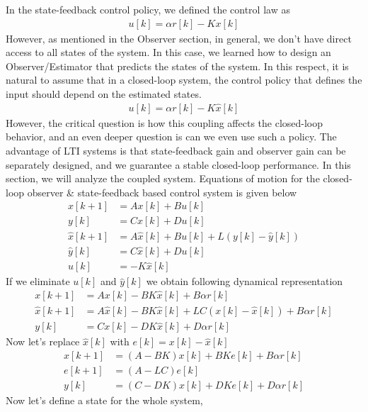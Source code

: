 \documentclass[twoside]{article}
\begin{document}
In the state-feedback control policy, we defined the control
law as
%
\begin{align*}
 u[k] = \alpha r[k] - K x[k]
\end{align*}
%
However, as mentioned in the Observer section, in general, we don't have direct access to all states of the system. In this case, we learned how to design an Observer/Estimator that predicts the states of the system. In this respect, it is natural to assume that in a closed-loop system, the control policy that defines the input should depend on the estimated states.
%
\begin{align*}
 u[k] = \alpha r[k] - K \hat{x}[k]
\end{align*}
%
However, the critical question is how this coupling affects the closed-loop behavior, and an even deeper question is can we even use such a policy. The advantage of LTI systems is that state-feedback gain and observer gain can be separately designed, and we guarantee a stable closed-loop performance. In this section, we will analyze the coupled system.
%
Equations of motion for the closed-loop observer \& state-feedback
based control system is given below
%
\begin{align*}
   x[k+1] &= A x[k] + B u[k]
  \\ 
   y[k] &= C x[k] + D u[k]
  \\
  \hat{x}[k+1] &= A \hat{x}[k] + B u[k] + L \left( y[k] - \hat{y}[k] \right) 
  \\
  \hat{y}[k] &= C \hat{x}[k] + D u[k]
  \\
   u[k] &= -K \hat{x}[k]
\end{align*}
%
If we eliminate $u[k]$ and $\hat{y}[k]$ we obtain following 
dynamical representation
%
\begin{align*}
   x[k+1] &= A x[k] - B K \hat{x}[k] + B \alpha r[k]
  \\
  \hat{x}[k+1] &= A \hat{x}[k] - B K \hat{x}[k] + L C \left( x[k] -
                 \hat{x}[k] \right) + B \alpha r[k]
  \\ 
   y[k] &= C x[k] - D K \hat{x}[k] + D \alpha r[k]
\end{align*}
%
Now let's replace $\hat{x}[k]$ with $e[k] = x[k] - \hat{x}[k]$
%
\begin{align*}
   x[k+1] &= ( A - B K ) x[k] + B K e[k] + B \alpha r[k]
  \\
  e[k+1] &= ( A - LC ) e[k]
  \\ 
   y[k] &= (C - D K) x[k] + D K e[k] + D \alpha r[k]
\end{align*}
%
Now let's define a state for the whole system, 
\end{document}
